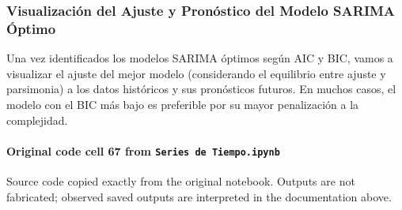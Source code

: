 \documentclass[
  11pt,
]{article}
\begin{document}
\subsubsection{Visualización del Ajuste y Pronóstico del Modelo SARIMA Óptimo}\label{visualizaciuxf3n-del-ajuste-y-pronuxf3stico-del-modelo-sarima-uxf3ptimo}

Una vez identificados los modelos SARIMA óptimos según AIC y BIC, vamos a visualizar el ajuste del mejor modelo (considerando el equilibrio entre ajuste y parsimonia) a los datos históricos y sus pronósticos futuros. En muchos casos, el modelo con el BIC más bajo es preferible por su mayor penalización a la complejidad.

\paragraph{\texorpdfstring{Original code cell 67 from \texttt{Series\ de\ Tiempo.ipynb}}{Original code cell 67 from Series de Tiempo.ipynb}}\label{original-code-cell-67-from-series-de-tiempoipynb}

Source code copied exactly from the original notebook. Outputs are not fabricated; observed saved outputs are interpreted in the documentation above.
\end{document}
